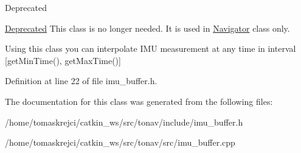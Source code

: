 \begin{DoxyRefDesc}{Deprecated}
\item[\hyperlink{deprecated__deprecated000001}{Deprecated}]This class is no longer needed. It is used in \hyperlink{class_navigator}{Navigator} class only.\end{DoxyRefDesc}


Using this class you can interpolate I\-M\-U measurement at any time in interval \mbox{[}get\-Min\-Time(), get\-Max\-Time()\mbox{]} 

Definition at line 22 of file imu\-\_\-buffer.\-h.



The documentation for this class was generated from the following files\-:\begin{DoxyCompactItemize}
\item 
/home/tomaskrejci/catkin\-\_\-ws/src/tonav/include/imu\-\_\-buffer.\-h\item 
/home/tomaskrejci/catkin\-\_\-ws/src/tonav/src/imu\-\_\-buffer.\-cpp\end{DoxyCompactItemize}

